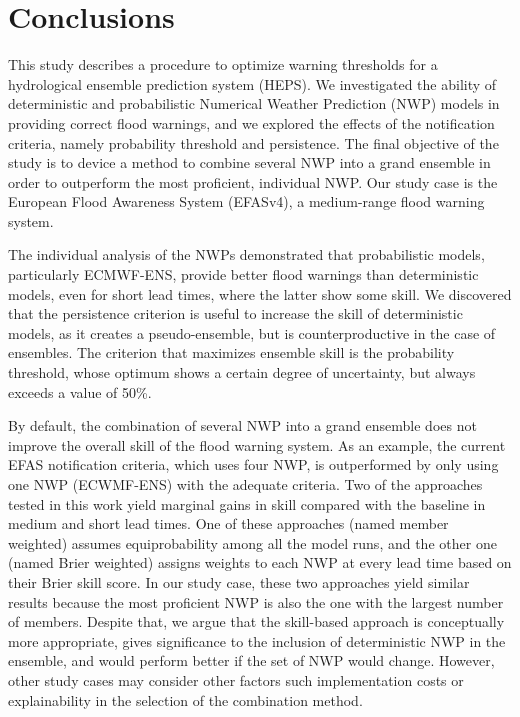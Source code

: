 \documentclass[preprint,12pt,authoryear]{elsarticle}
\begin{document}
\section{Conclusions}
\label{sec:conclusions}

This study describes a procedure to optimize warning thresholds for a hydrological ensemble prediction system (HEPS). We investigated the ability of deterministic and probabilistic Numerical Weather Prediction (NWP) models in providing correct flood warnings, and we explored the effects of the notification criteria, namely probability threshold and persistence. The final objective of the study is to device a method to combine several NWP into a grand ensemble in order to outperform the most proficient, individual NWP. Our study case is the European Flood Awareness System (EFASv4), a medium-range flood warning system.

The individual analysis of the NWPs demonstrated that probabilistic models, particularly ECMWF-ENS, provide better flood warnings than deterministic models, even for short lead times, where the latter show some skill. We discovered that the persistence criterion is useful to increase the skill of deterministic models, as it creates a pseudo-ensemble, but is counterproductive in the case of ensembles. The criterion that maximizes ensemble skill is the probability threshold, whose optimum shows a certain degree of uncertainty, but always exceeds a value of 50\%.

By default, the combination of several NWP into a grand ensemble does not improve the overall skill of the flood warning system. As an example, the current EFAS notification criteria, which uses four NWP, is outperformed by only using one NWP (ECWMF-ENS) with the adequate criteria. Two of the approaches tested in this work yield marginal gains in skill compared with the baseline in medium and short lead times. One of these approaches (named member weighted) assumes equiprobability among all the model runs, and the other one (named Brier weighted) assigns weights to each NWP at every lead time based on their Brier skill score. In our study case, these two approaches yield similar results because the most proficient NWP is also the one with the largest number of members. Despite that, we argue that the skill-based approach is conceptually more appropriate, gives significance to the inclusion of deterministic NWP in the ensemble, and would perform better if the set of NWP would change. However, other study cases may consider other factors such implementation costs or explainability in the selection of the combination method.
\end{document}
